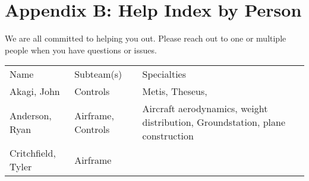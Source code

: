 \documentclass[]{auvsi_doc}
\begin{document}
\section{Appendix B: Help Index by Person}

{We are all committed to helping you out. Please reach out to one or
multiple people when you have questions or issues.}

{}


\begin{longtable}[]{@{}lll@{}}
\toprule
\begin{minipage}[t]{0.30\columnwidth}\raggedright\strut
{Name}\strut
\end{minipage} & \begin{minipage}[t]{0.30\columnwidth}\raggedright\strut
{Subteam(s)}\strut
\end{minipage} & \begin{minipage}[t]{0.30\columnwidth}\raggedright\strut
{Specialties}\strut
\end{minipage}\tabularnewline
\begin{minipage}[t]{0.30\columnwidth}\raggedright\strut
{Akagi, John}\strut
\end{minipage} & \begin{minipage}[t]{0.30\columnwidth}\raggedright\strut
{Controls}\strut
\end{minipage} & \begin{minipage}[t]{0.30\columnwidth}\raggedright\strut
{Metis, Theseus,}\strut
\end{minipage}\tabularnewline
\begin{minipage}[t]{0.30\columnwidth}\raggedright\strut
{Anderson, Ryan}\strut
\end{minipage} & \begin{minipage}[t]{0.30\columnwidth}\raggedright\strut
{Airframe, Controls}\strut
\end{minipage} & \begin{minipage}[t]{0.30\columnwidth}\raggedright\strut
{Aircraft aerodynamics, weight distribution, Groundstation, plane
construction}\strut
\end{minipage}\tabularnewline
\begin{minipage}[t]{0.30\columnwidth}\raggedright\strut
{Critchfield, Tyler}\strut
\end{minipage} & \begin{minipage}[t]{0.30\columnwidth}\raggedright\strut
{Airframe}\strut
\end{minipage} & \begin{minipage}[t]{0.30\columnwidth}\raggedright\strut

\end{minipage}
\end{longtable}
\end{document}
